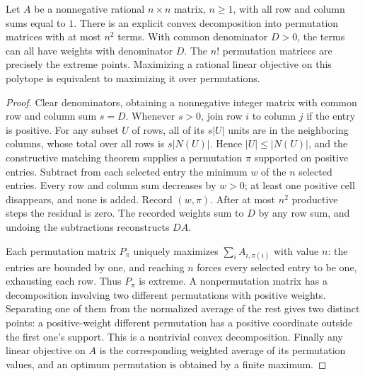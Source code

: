 \begin{theorem}\label{result54}
Let \(A\) be a nonnegative rational \(n\times n\) matrix, \(n\ge1\),
with all row and column sums equal to \(1\). There is an explicit convex
decomposition into permutation matrices with at most \(n^2\) terms.
With common denominator \(D>0\), the terms can all have weights with
denominator \(D\). The \(n!\) permutation matrices are precisely the
extreme points. Maximizing a rational linear objective on this polytope
is equivalent to maximizing it over permutations.
\end{theorem}
\begin{proof}
Clear denominators, obtaining a nonnegative integer matrix with common
row and column sum \(s=D\). Whenever \(s>0\), join row \(i\) to column
\(j\) if the entry is positive. For any subset \(U\) of rows, all of
its \(s|U|\) units are in the neighboring columns, whose total over all
rows is \(s|N(U)|\). Hence \(|U|\le|N(U)|\), and the constructive
matching theorem supplies a permutation \(\pi\) supported on positive
entries. Subtract from each selected entry the minimum \(w\) of the
\(n\) selected entries. Every row and column sum decreases by \(w>0\);
at least one positive cell disappears, and none is added. Record
\((w,\pi)\). After at most \(n^2\) productive steps the residual is zero.
The recorded weights sum to \(D\) by any row sum, and undoing the
subtractions reconstructs \(DA\).

Each permutation matrix \(P_\pi\) uniquely maximizes
\(\sum_i A_{i,\pi(i)}\) with value \(n\): the entries are bounded by
one, and reaching \(n\) forces every selected entry to be one, exhausting
each row. Thus \(P_\pi\) is extreme. A nonpermutation matrix has a
decomposition involving two different permutations with positive weights.
Separating one of them from the normalized average of the rest gives
two distinct points: a positive-weight different permutation has a
positive coordinate outside the first one's support. This is a
nontrivial convex decomposition. Finally any linear objective on \(A\)
is the corresponding weighted average of its permutation values, and
an optimum permutation is obtained by a finite maximum.
\end{proof}

